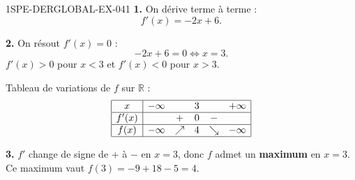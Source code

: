 \begin{corrige}{1SPE-DERGLOBAL-EX-041}
\textbf{1.} On dérive terme à terme :
\[
f'(x) = -2x + 6.
\]

\textbf{2.} On résout $f'(x) = 0$ :
\[
-2x + 6 = 0 \iff x = 3.
\]
$f'(x) > 0$ pour $x < 3$ et $f'(x) < 0$ pour $x > 3$.

Tableau de variations de $f$ sur $\mathbb{R}$ :
\[
\begin{array}{|c|ccccc|}
\hline
x     & -\infty & & 3 & & +\infty \\
\hline
f'(x) &         & + & 0 & - & \\
\hline
f(x)  & -\infty & \nearrow & 4 & \searrow & -\infty \\
\hline
\end{array}
\]

\textbf{3.} $f'$ change de signe de $+$ à $-$ en $x = 3$, donc $f$ admet un \textbf{maximum} en $x = 3$.
Ce maximum vaut $f(3) = -9 + 18 - 5 = \boxed{4}$.
\end{corrige}
